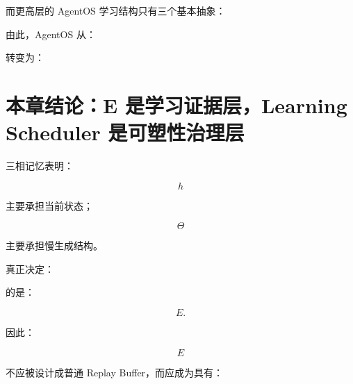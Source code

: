 而更高层的 AgentOS 学习结构只有三个基本抽象：

\begin{statementbox}
\centering
{}
\end{statementbox}

\begin{statementbox}
\centering
{}
\end{statementbox}

\begin{statementbox}
\centering
{}
\end{statementbox}

由此，AgentOS 从：

\begin{statementbox}
\centering
{}
\end{statementbox}

转变为：

\begin{statementbox}
\centering
{}
\end{statementbox}


\section{本章结论：E 是学习证据层，Learning Scheduler 是可塑性治理层}

三相记忆表明：

\[
h
\]

主要承担当前状态；

\[
\Theta
\]

主要承担慢生成结构。

真正决定：

\begin{statementbox}
\centering
{}
\end{statementbox}

的是：

\[
E.
\]

因此：

\[
\boxed{
E
}
\]

不应被设计成普通 Replay Buffer，而应成为具有：

